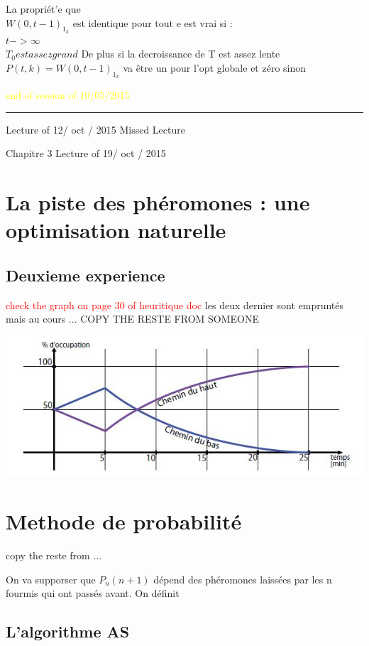 La propri\'et'e que\\
$W(0,t-1)_{1_k}$    est identique pour tout e est vrai si :\\
$t -> \infty $\\
$T_0 est assez grand$
De plus si la decroissance de T est assez lente  \\
$P(t,k) = W(0,t-1)_{1_k}$ va \^etre un pour l'opt globale et z\'ero sinon

\textcolor{yellow}{end of session of 10/05/2015}\\
\noindent\rule{12cm}{0.4pt}

\newpage
\LARGE Lecture of 12/ oct / 2015
\hfill Missed Lecture
\newpage


\centerline{Chapitre 3 Lecture of 19/ oct / 2015}
\section{La piste des phéromones : une optimisation
naturelle}

\subsection{Deuxieme experience }
\textcolor{red}{check the graph on  page 30 of heuritique doc}
les deux dernier sont empruntés mais au cours ... COPY THE RESTE FROM SOMEONE

\includegraphics[scale=0.9]{./images/resultatexperimental.jpg}

\section{Methode de probabilité}

copy the reste from ...

On va supporser que $P_u(n+1)$ dépend des phéromones laissées par les n fourmis qui ont passés avant.
On définit 

\subsection{L'algorithme AS}

